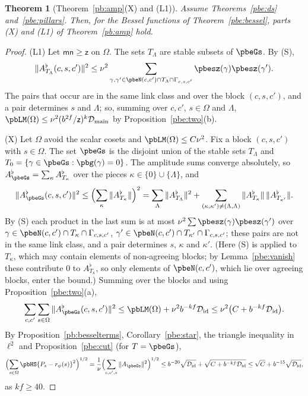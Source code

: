 \documentclass[10pt]{amsart}
\newtheorem{theorem}{Theorem}[section]
\theoremstyle{definition}
\theoremstyle{remark}
\providecommand{\pbDid}{\mathcal D_{\mathrm{id}}}
\providecommand{\pbDmain}{\mathcal D_{\mathrm{main}}}
\providecommand{\pbrpsi}{r_\psi}
\begin{document}
\begin{theorem}[Theorem~\ref{pb:amp}\textup{(X)} and \textup{(L1)}]\label{pbe:XL1}
Assume Theorems~\ref{pbe:ds} and~\ref{pbe:pillars}. Then, for the Bessel functions of
Theorem~\ref{pbe:bessel}, parts \textup{(X)} and \textup{(L1)} of Theorem~\ref{pb:amp} hold.
\end{theorem}
\begin{proof}
(L1) Let $\mathsf{mn}\ge\mathsf z$ on $\Omega$. The sets $T_\Lambda$ are stable subsets of $\pbeGs$.
By (S),
\[
\|A^\flat_{T_\Lambda}(c,s,c')\|^2\le\nu^2\sum_{\gamma,\gamma'\in\pbeN(c,c')\cap T_\Lambda\cap\Gamma_{c,
s,c'}}\pbesz(\gamma)\pbesz(\gamma').
\]
The pairs that occur are in the same link class and over the block $(c,s,c')$, and a pair determines
$s$ and $\Lambda$; so, summing over $c,c'$, $s\in\Omega$ and $\Lambda$, $\pbLM(\Omega)\le\nu^2(b^{2f}/
\mathsf z)^k\pbDmain$ by Proposition~\ref{pbe:two}(b).

(X) Let $\Omega$ avoid the scalar cosets and $\pbLM(\Omega)\le C\nu^2$. Fix a block $(c,s,c')$ with
$s\in\Omega$. The set $\pbeGs$ is the disjoint union of the stable sets $T_\Lambda$ and $T_0=\{\gamma
\in\pbeGs:\pbg(\gamma)=0\}$. The amplitude sums converge absolutely, so $A^\flat_{\pbeGs}=\sum_\kappa
A^\flat_{T_\kappa}$ over the pieces $\kappa\in\{0\}\cup\{\Lambda\}$, and
\[
\|A^\flat_{\pbeGs}(c,s,c')\|^2\le\Bigl(\sum_\kappa\|A^\flat_{T_\kappa}\|\Bigr)^2=\sum_\Lambda\|A^\flat_{
T_\Lambda}\|^2+\sum_{(\kappa,\kappa')\ne(\Lambda,\Lambda)}\|A^\flat_{T_\kappa}\|\,\|A^\flat_{T_{\kappa'}}\|.
\]
By (S) each product in the last sum is at most $\nu^2\sum\pbesz(\gamma)\pbesz(\gamma')$ over $\gamma\in
\pbeN(c,c')\cap T_\kappa\cap\Gamma_{c,s,c'}$, $\gamma'\in\pbeN(c,c')\cap T_{\kappa'}\cap\Gamma_{c,s,c'}$;
these pairs are not in the same link class, and a pair determines $s$, $\kappa$ and $\kappa'$. (Here (S) is applied to $T_\kappa$, which may contain elements of non-agreeing blocks; by Lemma~\ref{pbe:vanish} these contribute $0$ to $A^\flat_{T_\kappa}$, so only elements of $\pbeN(c,c')$, which lie over agreeing blocks, enter the bound.)
Summing over the blocks and using Proposition~\ref{pbe:two}(a),
\[
\sum_{c,c'}\sum_{s\in\Omega}\|A^\flat_{\pbeGs}(c,s,c')\|^2\le\pbLM(\Omega)+\nu^2b^{-kf}\pbDid\le\nu^2\bigl(C
+b^{-kf}\pbDid\bigr).
\]
By Proposition~\ref{pb:besselterms}, Corollary~\ref{pbe:star}, the triangle inequality in $\ell^2$
and Proposition~\ref{pbe:cut} (for $T=\pbeGs$),
\[
\Bigl(\sum_{s\in\Omega}\pbHS{P_s-\pbrpsi(s)}^2\Bigr)^{1/2}=\frac1\nu\Bigl(\sum_{c,c',s}\|A_{\pbeGs}\|^2
\Bigr)^{1/2}\le b^{-20}\sqrt{\pbDid}+\sqrt{C+b^{-kf}\pbDid}\le\sqrt C+b^{-15}\sqrt{\pbDid},
\]
as $kf\ge40$.
\end{proof}
\end{document}
